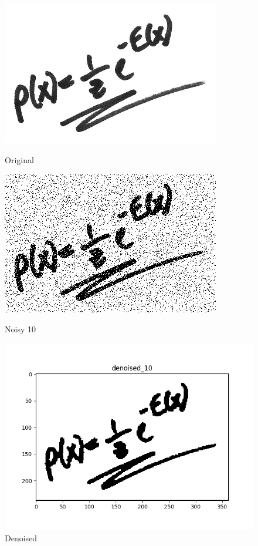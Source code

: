 \begin{figure}[!htb]
  \includegraphics[width=\linewidth]{pa4/orig.png}
  \caption{Original}\label{fig:awesome_image1}
\endminipage\hfill
{}
  \includegraphics[width=\linewidth]{pa4/noisy_10.png}
  \caption{Noisy 10}\label{fig:awesome_image2}
\endminipage\hfill
{}%
  \includegraphics[width=\linewidth]{pa4/denoised_10.png}
  \caption{Denoised}\label{fig:awesome_image3}
\endminipage
\end{figure}

